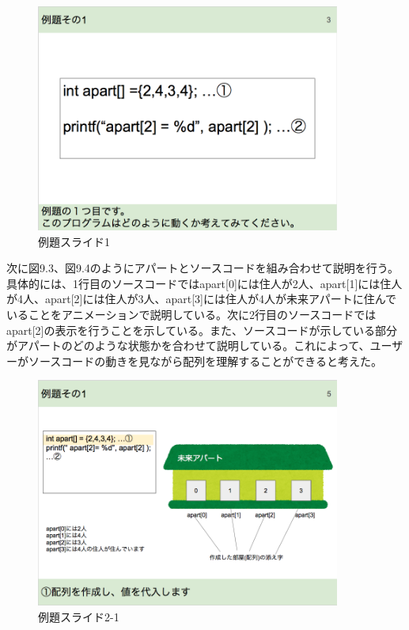 \documentclass[openany,11pt,papersize]{jsbook}
\begin{document}
\begin{figure}[H]
\begin{center}
\includegraphics[width=10cm, bb=0 0 852 638]{img/9thParagraph/reidai_01.png}
\end{center}
\caption{例題スライド1}
\end{figure}

次に図9.3、図9.4のようにアパートとソースコードを組み合わせて説明を行う。具体的には、1行目のソースコードではapart[0]には住人が2人、apart[1]には住人が4人、apart[2]には住人が3人、apart[3]には住人が4人が未来アパートに住んでいることをアニメーションで説明している。次に2行目のソースコードではapart[2]の表示を行うことを示している。また、ソースコードが示している部分がアパートのどのような状態かを合わせて説明している。これによって、ユーザーがソースコードの動きを見ながら配列を理解することができると考えた。

\begin{figure}[H]
\begin{center}
\includegraphics[width=10cm, bb=0 0 850 640]{img/9thParagraph/reidai_02.png}
\end{center}
\caption{例題スライド2-1}
\end{figure}
\end{document}
